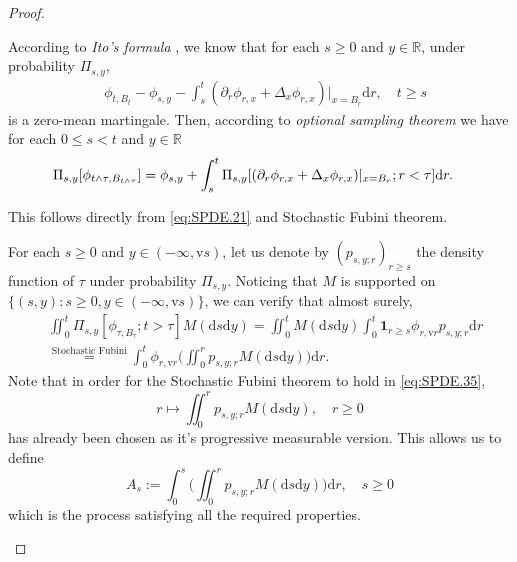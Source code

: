\documentclass[12pt,a4paper]{amsart}
\numberwithin{equation}{section}
\theoremstyle{plain}
\theoremstyle{remark}
\newenvironment{proof*}[1][\proofname]{
	\renewcommand\qedsymbol{\rule{3mm}{3mm}}
	\begin{proof}[#1]}{\end{proof}}
\begin{document}
\begin{proof}
\begin{proof*}
	According to \emph{Ito's formula} \cite[Theorem 3.3 and Remark 1 on p.~147]{RevuzYor1999Continuous}, we know that for each $s\geq 0$ and $y\in \mathbb R$, under probability $\Pi_{s,y}$,
\begin{align} 
& \phi_{t,B_t} - \phi_{s,y} - \int_s^t (\partial_r \phi_{r,x} + \Delta_x \phi_{r,x})|_{x=B_r} \mathrm dr, \quad t\geq s 
\end{align}
	is a zero-mean martingale.
	Then, according to \emph{optional sampling theorem} \cite[Theorem 7.29]{Kallenberg2002Foundations} we have for each $0\leq s< t$ and $y\in \mathbb R$
\begin{align} 
&  \Pi_{s,y}[\phi_{t\wedge \tau, B_{t\wedge \tau}}] 
= \phi_{s,y} + \int_s^t \Pi_{s,y}[(\partial_r\phi_{r,x}+\Delta_x\phi_{r,x})|_{x=B_r}; r< \tau]\mathrm dr.
\qedhere
\end{align}
\end{proof*}
\begin{proof*}
	This follows directly from \eqref{eq:SPDE.21} and Stochastic Fubini theorem.
\end{proof*}
\begin{proof*}
	For each $s\geq 0$ and $y \in (-\infty, \mathrm vs)$, let us denote by $(p_{s,y;r})_{r\geq s}$ the density function of $\tau$ under probability $\Pi_{s,y}$.
	Noticing that $M$ is supported on $\{(s,y): s\geq 0, y \in (-\infty, \mathrm vs)\}$, we can verify that almost surely,
\begin{align}
	&\iint_0^t \Pi_{s,y}[\phi_{\tau, B_\tau}; t>\tau] M(\mathrm ds\mathrm dy) 
	= \iint_0^t M(\mathrm ds\mathrm dy) \int_0^t \mathbf 1_{r\geq s} \phi_{r,\mathrm vr} p_{s,y;r} \mathrm dr
	\\& \label{eq:SPDE.35}\overset{\text{Stochastic Fubini}}= \int_0^t\phi_{r,\mathrm vr} \Big(\iint_0^r p_{s,y;r} M(\mathrm ds\mathrm dy)\Big)  \mathrm dr.
\end{align}
	Note that in order for the Stochastic Fubini theorem to hold in \eqref{eq:SPDE.35}, 
\[
	r\mapsto \iint_0^r p_{s,y;r} M(\mathrm ds\mathrm dy), \quad r\geq 0
\]  
	has already been chosen as it's progressive measurable version. 
	This allows us to define
\[
	A_s := \int_0^s \Big(\iint_0^r p_{s,y;r} M(\mathrm ds\mathrm dy)\Big) \mathrm dr, \quad s\geq 0
\]
	which is the process satisfying all the required properties.
\end{proof*}
\end{proof}
\end{document}
